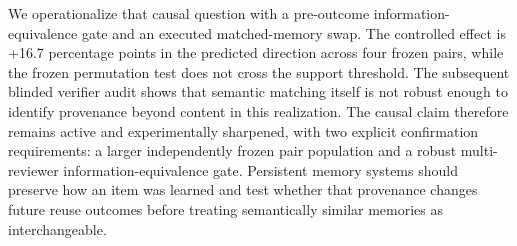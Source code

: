 We operationalize that causal question with a pre-outcome information-equivalence gate and an executed matched-memory swap. The controlled effect is +16.7 percentage points in the predicted direction across four frozen pairs, while the frozen permutation test does not cross the support threshold. The subsequent blinded verifier audit shows that semantic matching itself is not robust enough to identify provenance beyond content in this realization. The causal claim therefore remains active and experimentally sharpened, with two explicit confirmation requirements: a larger independently frozen pair population and a robust multi-reviewer information-equivalence gate. Persistent memory systems should preserve how an item was learned and test whether that provenance changes future reuse outcomes before treating semantically similar memories as interchangeable.
